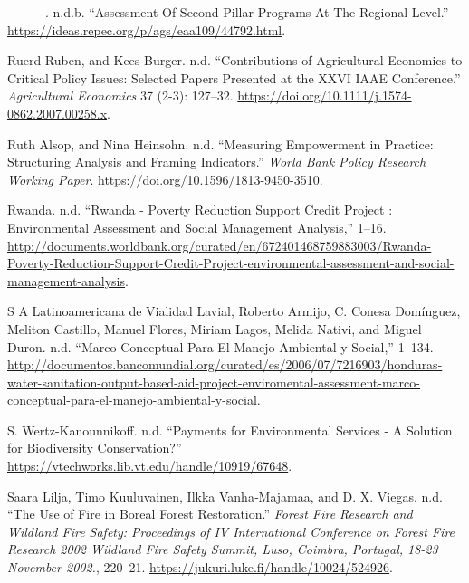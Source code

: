 \begin{CSLReferences}{1}{0}
---------. n.d.b. {``Assessment Of Second Pillar Programs At The
Regional Level.''}
\url{https://ideas.repec.org/p/ags/eaa109/44792.html}.

Ruerd Ruben, and Kees Burger. n.d. {``Contributions of Agricultural
Economics to Critical Policy Issues: Selected Papers Presented at the
XXVI IAAE Conference.''} \emph{Agricultural Economics} 37 (2-3):
127--32. \url{https://doi.org/10.1111/j.1574-0862.2007.00258.x}.

Ruth Alsop, and Nina Heinsohn. n.d. {``Measuring Empowerment in
Practice: Structuring Analysis and Framing Indicators.''} \emph{World
Bank Policy Research Working Paper}.
\url{https://doi.org/10.1596/1813-9450-3510}.

Rwanda. n.d. {``Rwanda - Poverty Reduction Support Credit Project :
Environmental Assessment and Social Management Analysis,''} 1--16.
\url{http://documents.worldbank.org/curated/en/672401468759883003/Rwanda-Poverty-Reduction-Support-Credit-Project-environmental-assessment-and-social-management-analysis}.

S A Latinoamericana de Vialidad Lavial, Roberto Armijo, C. Conesa
Domínguez, Meliton Castillo, Manuel Flores, Miriam Lagos, Melida Nativi,
and Miguel Duron. n.d. {``Marco Conceptual Para El Manejo Ambiental y
Social,''} 1--134.
\url{http://documentos.bancomundial.org/curated/es/2006/07/7216903/honduras-water-sanitation-output-based-aid-project-enviromental-assessment-marco-conceptual-para-el-manejo-ambiental-y-social}.

S. Wertz-Kanounnikoff. n.d. {``Payments for Environmental Services - A
Solution for Biodiversity Conservation?''}
\url{https://vtechworks.lib.vt.edu/handle/10919/67648}.

Saara Lilja, Timo Kuuluvainen, Ilkka Vanha‐Majamaa, and D. X. Viegas.
n.d. {``The Use of Fire in Boreal Forest Restoration.''} \emph{Forest
Fire Research and Wildland Fire Safety: Proceedings of IV International
Conference on Forest Fire Research 2002 Wildland Fire Safety Summit,
Luso, Coimbra, Portugal, 18-23 November 2002.}, 220--21.
\url{https://jukuri.luke.fi/handle/10024/524926}.


\end{CSLReferences}
